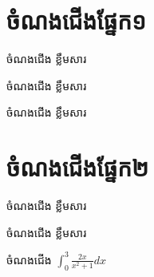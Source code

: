 \documentclass[12pt,ignorenonframetext]{beamer}
\begin{document}
\begin{frame}
\titlepage
\end{frame}
\begin{frame}
\tableofcontents
\end{frame}
\section{ចំណងជើងផ្នែក១}
\begin{frame}{ចំណងជើង}
ខ្លឹមសារ
\end{frame}
\begin{frame}{ចំណងជើង}
ខ្លឹមសារ
\end{frame}
\begin{frame}{ចំណងជើង}
ខ្លឹមសារ
\end{frame}
\section{ចំណងជើងផ្នែក២}
\begin{frame}{ចំណងជើង}
ខ្លឹមសារ
\end{frame}
\begin{frame}{ចំណងជើង}
ខ្លឹមសារ
\end{frame}
\begin{frame}{ចំណងជើង}
$\int_{0}^{3}\frac{2x}{x^2+1}dx$
\end{frame}
\end{document}
